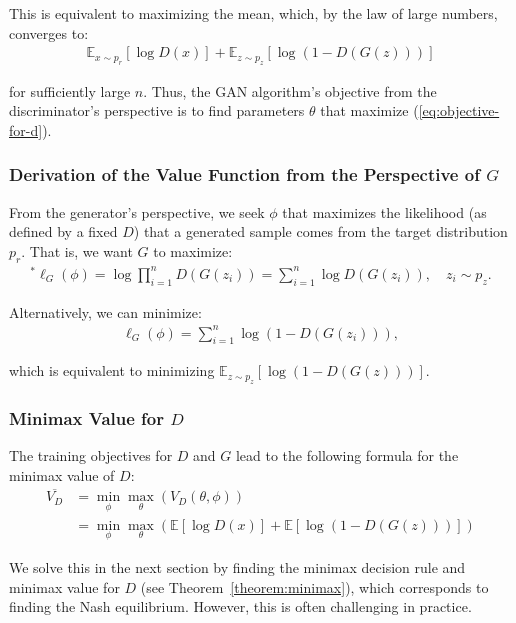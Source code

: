 This is equivalent to maximizing the mean, which, by the law of large numbers, converges to:
\begin{align}
	\label{eq:objective-for-d}
	\mathbb{E}_{x \sim p_r}[\log D(x)] + \mathbb{E}_{z \sim p_z}[\log{(1 - D(G(z)))}]
\end{align}

for sufficiently large $n$. Thus, the GAN algorithm's objective from the discriminator's perspective is to find parameters $\theta$ that maximize (\ref{eq:objective-for-d}).

\subsubsection{Derivation of the Value Function from the Perspective of $G$}%
\label{sec:derivation-g}

From the generator's perspective, we seek $\phi$ that maximizes the likelihood (as defined by a fixed $D$) that a generated sample comes from the target distribution $p_r$. That is, we want $G$ to maximize:
\begin{align}
	^*\ell_G(\phi) = \log\prod_{i=1}^n D(G(z_i)) = \sum_{i=1}^n \log{D(G(z_i))}, \quad z_i \sim p_z.
\end{align}

Alternatively, we can minimize:
\begin{align}
	\ell_G(\phi) = \sum_{i=1}^n \log{(1 - D(G(z_i)))},
\end{align}

which is equivalent to minimizing $\mathbb{E}_{z \sim p_z} \left[\log{(1 - D(G(z)))} \right]$.

\subsubsection{Minimax Value for $D$}

The training objectives for $D$ and $G$ lead to the following formula for the minimax value of $D$:
\begin{align}
	\overline{V_{D}} & = \min_{\phi}\max_{\theta}\left(V_{D}(\theta, \phi) \right)                                                          \\
	                 & = \min_{\phi}\max_{\theta}\left(\mathbb{E}\left[\log{D(x)}\right] + \mathbb{E}\left[\log(1 - D(G(z)))\right] \right)
\end{align}

We solve this in the next section by finding the minimax decision rule and minimax value for $D$ (see Theorem~\ref{theorem:minimax}), which corresponds to finding the Nash equilibrium. However, this is often challenging in practice.

